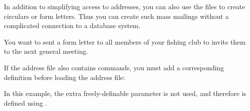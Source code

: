 In addition to simplifying access to addresses, you can also use the
 files to create circulars or form letters. Thus you can create such
mass mailings without a complicated connection to a database system.
%
\begin{Example}
  You want to sent a form letter to all members of your fishing club to invite
  them to the next general meeting.
  If the address file also contains 
  commands, you must add a corresponding definition before loading the address
  file:
\begin{lstcode}
  \renewcommand*{\addrentry}[9]{%
    \adrentry{#1}{#2}{#3}{#4}{#5}{#6}{#7}{#9}%
  }
\end{lstcode}
  In this example, the extra freely-definable parameter is not used, and
  therefore  is defined using
  .
\end{Example}

